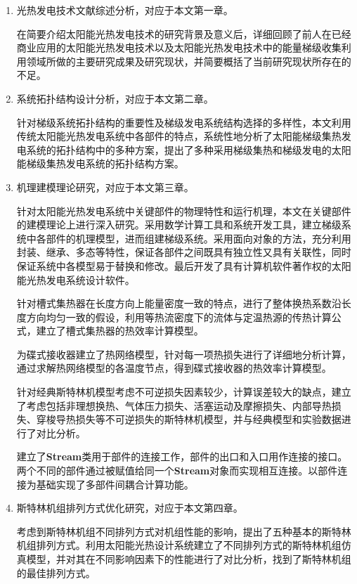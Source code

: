 \begin{enumerate}[label=(\arabic*)]
	
	\item 光热发电技术文献综述分析，对应于本文第一章。
	
	在简要介绍太阳能光热发电技术的研究背景及意义后，详细回顾了前人在已经商业应用的太阳能光热发电技术以及太阳能光热发电技术中的能量梯级收集利用领域所做的主要研究成果及研究现状，并简要概括了当前研究现状所存在的不足。
	\item 系统拓扑结构设计分析，对应于本文第二章。
	
	针对梯级系统拓扑结构的重要性及梯级发电系统结构选择的多样性，本文利用传统太阳能光热发电系统中各部件的特点，系统性地分析了太阳能梯级集热发电系统的拓扑结构中的多种方案，提出了多种采用梯级集热和梯级发电的太阳能梯级集热发电系统的拓扑结构方案。 

	\item 机理建模理论研究，对应于本文第三章。
	
	针对太阳能光热发电系统中关键部件的物理特性和运行机理，本文在关键部件的建模理论上进行深入研究。采用数学计算工具和系统开发工具，建立梯级系统中各部件的机理模型，进而组建梯级系统。采用面向对象的方法，充分利用封装、继承、多态等特性，保证各部件之间既具有独立性又具有关联性，同时保证系统中各模型易于替换和修改。最后开发了具有计算机软件著作权的太阳能光热发电系统设计软件。
	
	针对槽式集热器在长度方向上能量密度一致的特点，进行了整体换热系数沿长度方向均匀一致的假设，利用等热流密度下的流体与定温热源的传热计算公式，建立了槽式集热器的热效率计算模型。
	
	为碟式接收器建立了热网络模型，针对每一项热损失进行了详细地分析计算，通过求解热网络模型的各温度节点，得到碟式接收器的热效率计算模型。
	
	针对经典斯特林机模型考虑不可逆损失因素较少，计算误差较大的缺点，建立了考虑包括非理想换热、气体压力损失、活塞运动及摩擦损失、内部导热损失、穿梭导热损失等不可逆损失的斯特林机模型，并与经典模型和实验数据进行了对比分析。
	
	建立了\textbf{Stream}类用于部件的连接工作，部件的出口和入口用作连接的接口。两个不同的部件通过被赋值给同一个\textbf{Stream}对象而实现相互连接。以部件连接为基础实现了多部件间耦合计算功能。

	\item 斯特林机组排列方式优化研究，对应于本文第四章。
	
	考虑到斯特林机组不同排列方式对机组性能的影响，提出了五种基本的斯特林机组排列方式。利用太阳能光热设计系统建立了不同排列方式的斯特林机组仿真模型，并对其在不同影响因素下的性能进行了对比分析，找到了斯特林机组的最佳排列方式。


\end{enumerate}
